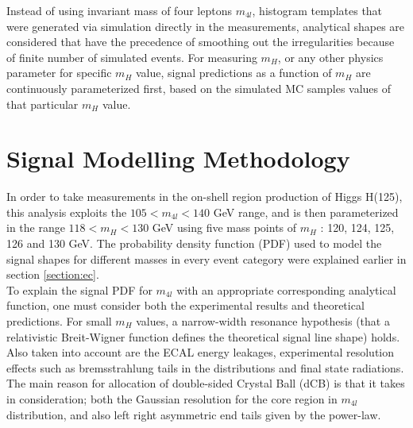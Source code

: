 Instead of using invariant mass of four leptons $m_{4l}$, histogram templates that were generated via simulation directly in the measurements, analytical shapes are considered that have the precedence of smoothing out the irregularities because of finite number of simulated events. For measuring $m_H$, or any other physics parameter for specific $m_H$ value, signal predictions as a function of $m_H$ are continuously parameterized first, based on the simulated MC samples values of that particular $m_H$ value.
\section{Signal Modelling Methodology}
\label{section:smm}
In order to take measurements in the on-shell region production of Higgs H(125), this analysis exploits the $105 < m_{4l} < 140$ GeV range, and is then parameterized in the range $118 < m_H <130$ GeV using five mass points of $m_H$ : 120, 124, 125, 126 and 130 GeV.
The probability density function (PDF) used to model the signal shapes
for different masses in every event category were explained earlier in section \ref{section:ec}.\\
To explain the signal PDF for $m_{4l}$ with an appropriate corresponding analytical function, one must consider both the experimental results and theoretical predictions. For small $m_H$ values, a narrow-width resonance hypothesis (that a relativistic Breit-Wigner function defines the theoretical signal line shape) holds. Also taken into account are the ECAL energy leakages, experimental resolution effects such as bremsstrahlung tails in the distributions and final state radiations.
The main reason for allocation of double-sided Crystal Ball (dCB) is that it takes in consideration; both the Gaussian resolution for the core region in $m_{4l}$ distribution, and also left right asymmetric end tails given by the power-law.
